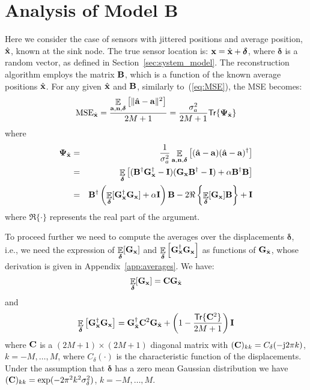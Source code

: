 \documentclass[final, a4paper]{IEEEtran}
\newcommand{\jj}{{\rm j}}  \newcommand{\ii}{{\rm i}}  \newcommand{\dd}{{\rm\,d}}
\newcommand{\av}{{\bf a}}
\newcommand{\nv}{{\bf n}}
\newcommand{\xv}{{\bf x}}
\newcommand{\Bm}{{\bf B}}
\newcommand{\Cm}{{\bf C}}
\newcommand{\Gm}{{\bf G}}
\newcommand{\Id}{{\bf I}}
\def\xvh{{\hat{\xv}}}
\newcommand{\deltav}{\boldsymbol{\delta}}
\newcommand{\Psim}{\hbox{\boldmath$\Psi$}}
\def\trace{\mathsf{Tr}}
\def\non{\nonumber\\}
\begin{document}
\section{Analysis of Model B}
\label{sec:model_C}

Here we consider the case of sensors with jittered positions and average position,
$\xvh$, known at the sink node.
The true sensor location is: $\xv=\xvh+\deltav$, where $\deltav$ is a random vector,
as defined in Section~\ref{sec:system_model}.
The reconstruction algorithm employs the matrix $\Bm$, which is a
function of the known average positions $\xvh$. For any given $\xvh$ and
$\Bm$, similarly to~(\ref{eq:MSE}), the MSE becomes:
\begin{equation}
{\rm MSE}_\xvh = \frac{\EE_{\av,\nv,\deltav}\left[ \|\hat{\av}-\av \|^2\right]}{2M+1} = \frac{\sigma^2_a}{2M+1}\trace\{\Psim_\xvh\}
\label{eq:MSE_B}
\end{equation}
where
\begin{eqnarray}
\Psim_\xvh &=& \frac{1}{\sigma^2_a}\EE_{\av,\nv,\deltav}\left[ (\hat{\av}-\av)(\hat{\av}-\av)\Herm\right] \non
&=& \EE_{\deltav}\left[ (\Bm\Herm\Gm_\xv\Herm-\Id)(\Gm_\xv\Bm\Herm-\Id) +\alpha\Bm\Herm\Bm \right] \non
&=& \Bm\Herm\left(\EE_{\deltav}[\Gm_\xv\Herm\Gm_\xv] +\alpha\Id\right)\Bm -2\Re\left\{\EE_{\deltav}[\Gm_\xv]\Bm\right\} +\Id \non
\label{eq:Psi_B}
\end{eqnarray}
where $\Re\{\cdot\}$ represents the real part of the argument.

To proceed further we need to compute the averages over the
displacements $\deltav$, i.e.,  we need the expression of
$\EE_{\deltav}[\Gm_{\xv}]$ and
$\EE_{\deltav}\left[\Gm_\xv\Herm\Gm_\xv\right]$ as functions of
$\Gm_\xvh$, whose derivation is given in
Appendix~\ref{app:averages}. We have:
\begin{equation}\label{eq:EFx}
\EE_{\deltav}[\Gm_\xv] = \Cm\Gm_\xvh
\end{equation}
and
\begin{equation}\label{eq:EFxFhx}
\EE_{\deltav}\left[\Gm_\xv\Herm\Gm_\xv\right] =
\Gm_\xvh\Herm \Cm^2 \Gm_\xvh + \left(1-\frac{\trace\{\Cm^2\}}{2M+1}\right)\Id
\end{equation}
where $\Cm$ is a $(2M+1)\times (2M+1)$ diagonal matrix with
$(\Cm)_{kk}=C_\delta(-\jj 2\pi k)$, $k=-M,\ldots,M$, where
$C_\delta(\cdot)$ is the characteristic function of the
displacements. Under the assumption that $\deltav$ has a zero mean
Gaussian distribution we have $(\Cm)_{kk} = \exp(-2\pi^2 k^2
\sigma^2_\delta)$, $k=-M,\dots,M$.
\end{document}

